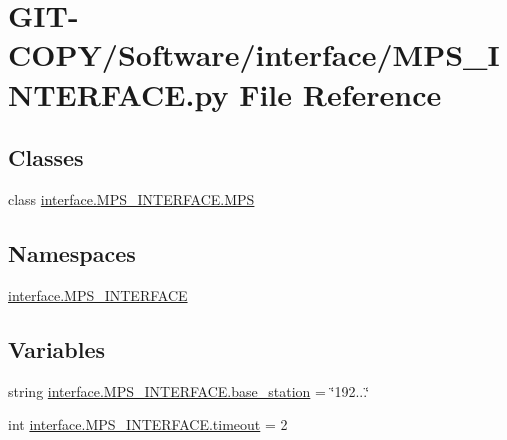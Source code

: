\hypertarget{GIT-COPY_2Software_2interface_2MPS__INTERFACE_8py}{}\section{G\+I\+T-\/\+C\+O\+P\+Y/\+Software/interface/\+M\+P\+S\+\_\+\+I\+N\+T\+E\+R\+F\+A\+C\+E.py File Reference}
\label{GIT-COPY_2Software_2interface_2MPS__INTERFACE_8py}
\subsection*{Classes}
\begin{DoxyCompactItemize}
\item 
class \hyperlink{classinterface_1_1MPS__INTERFACE_1_1MPS}{interface.\+M\+P\+S\+\_\+\+I\+N\+T\+E\+R\+F\+A\+C\+E.\+M\+P\+S}
\end{DoxyCompactItemize}
\subsection*{Namespaces}
\begin{DoxyCompactItemize}
\item 
 \hyperlink{namespaceinterface_1_1MPS__INTERFACE}{interface.\+M\+P\+S\+\_\+\+I\+N\+T\+E\+R\+F\+A\+C\+E}
\end{DoxyCompactItemize}
\subsection*{Variables}
\begin{DoxyCompactItemize}
\item 
string \hyperlink{namespaceinterface_1_1MPS__INTERFACE_abf005c90b33c5269b735be7080beafae}{interface.\+M\+P\+S\+\_\+\+I\+N\+T\+E\+R\+F\+A\+C\+E.\+base\+\_\+station} = \char`\"{}192...\char`\"{}
\item 
int \hyperlink{namespaceinterface_1_1MPS__INTERFACE_a8f99977d3b568944bdce9365f8f103a7}{interface.\+M\+P\+S\+\_\+\+I\+N\+T\+E\+R\+F\+A\+C\+E.\+timeout} = 2
\end{DoxyCompactItemize}
